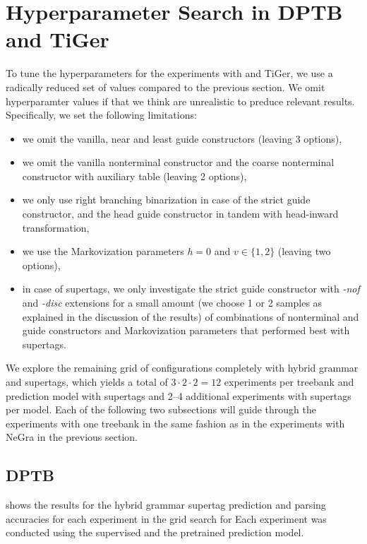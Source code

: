 \documentclass[../../document.tex]{subfiles}
\begin{document}
    \section{Hyperparameter Search in DPTB and TiGer}\label{sec:gridsearch:other}
    To tune the hyperparameters for the experiments with  and TiGer, we use a radically reduced set of values compared to the previous section.
    We omit hyperparamter values if that we think are unrealistic to preduce relevant results.
    Specifically, we set the following limitations:
    \begin{itemize}
        \item we omit the vanilla, near and least guide constructors (leaving 3 options),
        \item we omit the vanilla nonterminal constructor and the coarse nonterminal constructor with auxiliary table (leaving 2 options), 
        \item we only use right branching binarization in case of the strict guide constructor, and the head guide constructor in tandem with head-inward transformation,
        \item we use the Markovization parameters \(h = 0\) and \(v \in \{1,2\}\) (leaving two options),
        \item in case of  supertags, we only investigate the strict guide constructor with \emph{-nof} and \emph{-disc} extensions for a small amount (we choose 1 or 2 samples as explained in the discussion of the results) of combinations of nonterminal and guide constructors and Markovization parameters that performed best with  supertags.
    \end{itemize}

    We explore the remaining grid of configurations completely with hybrid grammar and  supertags, which yields a total of $3 \cdot 2 \cdot 2 = 12$ experiments per treebank and prediction model with  supertags and 2--4 additional experiments with  supertags per model.
    Each of the following two subsections will guide through the experiments with one treebank in the same fashion as in the experiments with NeGra in the previous section.

    \subsection{DPTB}
     shows the results for the hybrid grammar supertag prediction and parsing accuracies for each experiment in the grid search for 
    Each experiment was conducted using the supervised and the pretrained prediction model.
\end{document}
